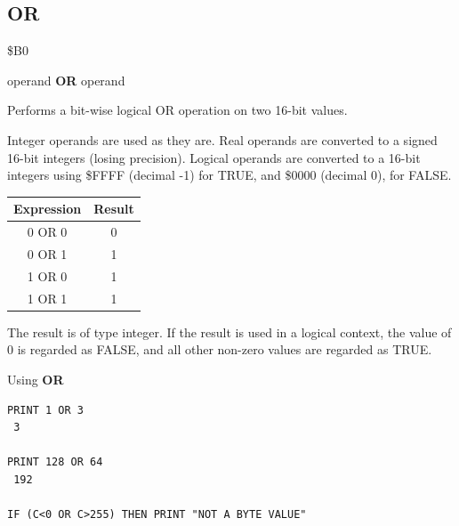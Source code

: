 \subsection{OR}
\begin{description}[leftmargin=2cm,style=nextline]
\item [Token:]    \$B0

\item [Format:]   operand {\bf OR} operand

\item [Usage:]    Performs a bit-wise logical OR operation on two 16-bit values.

                  Integer operands are used as they are. Real operands are converted to a signed 16-bit integers (losing precision). Logical operands are converted to a 16-bit integers using \$FFFF (decimal -1) for TRUE, and \$0000 (decimal 0), for FALSE.

                  \begin{center}
                  \setlength{\tabcolsep}{1mm}
                     \begin{tabular}{|c|c|}
                        \hline
                        {\bf Expression} & {\bf Result}  \\
                        \hline
                           0 OR 0  &  0 \\
                           0 OR 1  &  1 \\
                           1 OR 0  &  1 \\
                           1 OR 1  &  1 \\
                        \hline
                     \end{tabular}
                  \end{center}

\item [Remarks:]  The result is of type integer. If the result is used in a logical context, the value of 0 is regarded as FALSE, and all other non-zero values are regarded as TRUE.

\item [Examples:] Using {\bf OR}

\begin{tcolorbox}[colback=black,coltext=white]
\verbatimfont{\codefont}
\begin{verbatim}
PRINT 1 OR 3
 3

PRINT 128 OR 64
 192

IF (C<0 OR C>255) THEN PRINT "NOT A BYTE VALUE"
\end{verbatim}
\end{tcolorbox}
\end{description}

